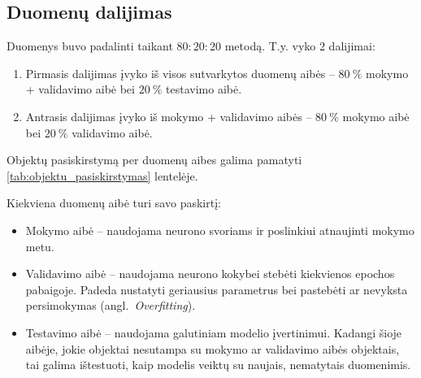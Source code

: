 \subsection{Duomenų dalijimas}
\label{subsec:duomenu_dalijimas}

Duomenys buvo padalinti taikant $80{:}20{:}20$ metodą. T.y. vyko 2 dalijimai:
\begin{enumerate}
    \item Pirmasis dalijimas įvyko iš visos sutvarkytos duomenų aibės – $80\ \%$ mokymo + validavimo aibė bei $20\ \%$ testavimo aibė.
    \item Antrasis dalijimas įvyko iš mokymo + validavimo aibės – $80\ \%$ mokymo aibė bei $20\ \%$ validavimo aibė.
\end{enumerate}

Objektų pasiskirstymą per duomenų aibes galima pamatyti \ref{tab:objektu_pasiskirstymas} lentelėje.



Kiekviena duomenų aibė turi savo paskirtį:
\begin{itemize}
    \item Mokymo aibė – naudojama neurono svoriams ir poslinkiui atnaujinti mokymo metu.
    \item Validavimo aibė – naudojama neurono kokybei stebėti kiekvienos epochos pabaigoje. Padeda nustatyti geriausius parametrus bei pastebėti ar nevyksta persimokymas (angl.~\textit{Overfitting}).
    \item Testavimo aibė – naudojama galutiniam modelio įvertinimui. Kadangi šioje aibėje, jokie objektai nesutampa su mokymo ar validavimo aibės objektais, tai galima ištestuoti, kaip modelis veiktų su naujais, nematytais duomenimis.
\end{itemize}